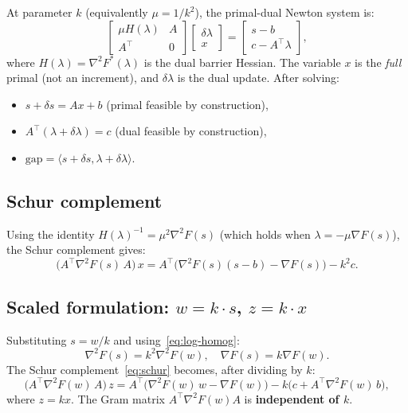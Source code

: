 \documentclass[11pt]{article}
\newcommand{\ip}[2]{\langle #1, #2 \rangle}
\begin{document}
At parameter $k$ (equivalently $\mu = 1/k^2$), the primal-dual Newton system is:
\begin{equation}\label{eq:kkt}
  \begin{bmatrix} \mu H(\lambda) & A \\ A^\top & 0 \end{bmatrix}
  \begin{bmatrix} \delta\lambda \\ x \end{bmatrix}
  =
  \begin{bmatrix} s - b \\ c - A^\top \lambda \end{bmatrix},
\end{equation}
where $H(\lambda) = \nabla^2 F^*(\lambda)$ is the dual barrier Hessian.
The variable $x$ is the \emph{full} primal (not an increment), and $\delta\lambda$
is the dual update.  After solving:
\begin{itemize}
  \item $s + \delta s = Ax + b$ \quad (primal feasible by construction),
  \item $A^\top(\lambda + \delta\lambda) = c$ \quad (dual feasible by construction),
  \item $\text{gap} = \ip{s + \delta s}{\lambda + \delta\lambda}$.
\end{itemize}

\subsection{Schur complement}

Using the identity $H(\lambda)^{-1} = \mu^2 \nabla^2 F(s)$ (which holds when
$\lambda = -\mu \nabla F(s)$), the Schur complement gives:
\begin{equation}\label{eq:schur}
  \bigl(A^\top \nabla^2 F(s) \, A\bigr) \, x
  = A^\top\bigl(\nabla^2 F(s)(s - b) - \nabla F(s)\bigr) - k^2 c.
\end{equation}

\subsection{Scaled formulation: $w = k \cdot s$, $z = k \cdot x$}

Substituting $s = w/k$ and using~\eqref{eq:log-homog}:
\[
  \nabla^2 F(s) = k^2 \nabla^2 F(w), \quad \nabla F(s) = k \nabla F(w).
\]
The Schur complement~\eqref{eq:schur} becomes, after dividing by $k$:
\begin{equation}\label{eq:schur-w}
  \bigl(A^\top \nabla^2 F(w) \, A\bigr) \, z
  = A^\top\bigl(\nabla^2 F(w) \, w - \nabla F(w)\bigr)
    - k \bigl(c + A^\top \nabla^2 F(w) \, b\bigr),
\end{equation}
where $z = kx$.  The Gram matrix $A^\top \nabla^2 F(w) A$ is \textbf{independent of $k$}.
\end{document}
